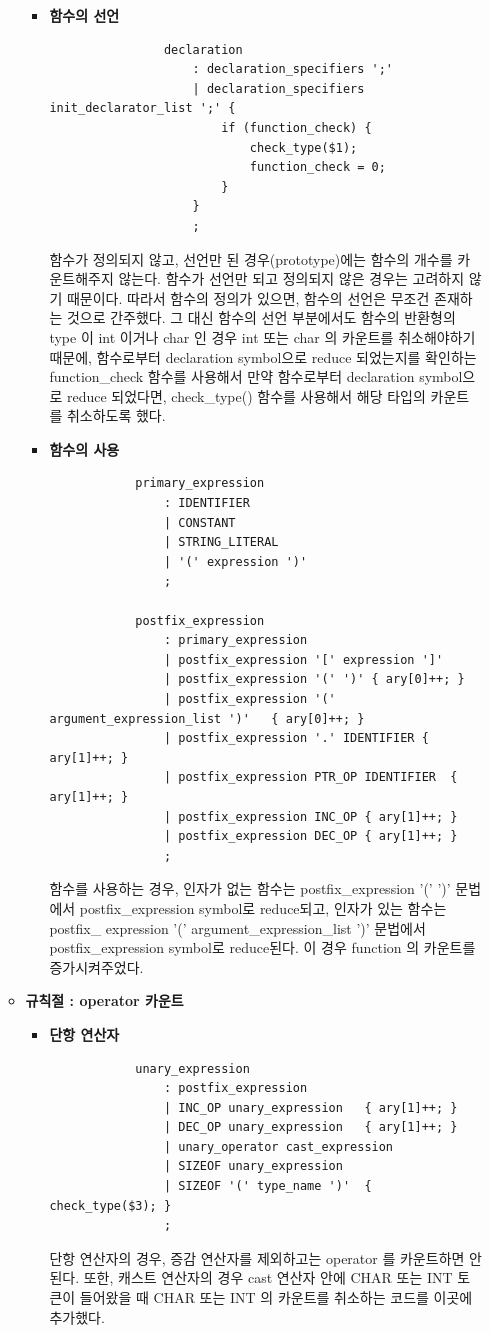 \documentclass{article}
\begin{document}
\begin{itemize}
\begin{itemize}
\begin{itemize}
			\item {\bf 함수의 선언}
			\begin{lstlisting}
				declaration
					: declaration_specifiers ';'
					| declaration_specifiers init_declarator_list ';' { 
						if (function_check) {
							check_type($1); 
							function_check = 0;
						}
					}
					;
			\end{lstlisting}
			함수가 정의되지 않고, 선언만 된 경우(prototype)에는 함수의 개수를 카운트해주지 않는다. 함수가 선언만 되고
			정의되지 않은 경우는 고려하지 않기 때문이다. 따라서 함수의 정의가 있으면, 함수의 선언은 무조건 존재하는 것으로
			간주했다. 그 대신 함수의 선언 부분에서도 함수의 반환형의 type 이 int 이거나 char 인 경우 int 또는 char
			의 카운트를 취소해야하기 때문에, 함수로부터 declaration symbol으로 reduce 되었는지를 확인하는
			function\_check 함수를 사용해서 만약 함수로부터 declaration symbol으로 reduce 되었다면,
			check\_type() 함수를 사용해서 해당 타입의 카운트를 취소하도록 했다.
		
			\item {\bf 함수의 사용}
			\begin{lstlisting}
			primary_expression
				: IDENTIFIER
				| CONSTANT
				| STRING_LITERAL
				| '(' expression ')'
				;

			postfix_expression
				: primary_expression
				| postfix_expression '[' expression ']'
				| postfix_expression '(' ')' { ary[0]++; }
				| postfix_expression '(' argument_expression_list ')'	{ ary[0]++; }
				| postfix_expression '.' IDENTIFIER	{ ary[1]++; }
				| postfix_expression PTR_OP IDENTIFIER	{ ary[1]++; }
				| postfix_expression INC_OP	{ ary[1]++; }
				| postfix_expression DEC_OP	{ ary[1]++; }
				;
			\end{lstlisting}
			함수를 사용하는 경우, 인자가 없는 함수는 postfix\_expression '(' ')' 문법에서 postfix\_expression
			symbol로 reduce되고, 인자가 있는 함수는 postfix\_ expression '(' argument\_expression\_list ')'
			문법에서 postfix\_expression symbol로 reduce된다. 이 경우 function 의 카운트를 증가시켜주었다.
		\end{itemize}

		\item {\bf 규칙절 : operator 카운트}
		\begin{itemize}
			\item {\bf 단항 연산자}
			\begin{lstlisting}
			unary_expression
				: postfix_expression
				| INC_OP unary_expression	{ ary[1]++; }
				| DEC_OP unary_expression	{ ary[1]++; }
				| unary_operator cast_expression
				| SIZEOF unary_expression
				| SIZEOF '(' type_name ')'	{ check_type($3); }
				;
			\end{lstlisting} 
			단항 연산자의 경우, 증감 연산자를 제외하고는 operator 를 카운트하면 안된다.
			또한, 캐스트 연산자의 경우 cast 연산자 안에 CHAR 또는 INT 토큰이 들어왔을 때
			CHAR 또는 INT 의 카운트를 취소하는 코드를 이곳에 추가했다.


\end{itemize}
\end{itemize}
\end{itemize}
\end{document}
